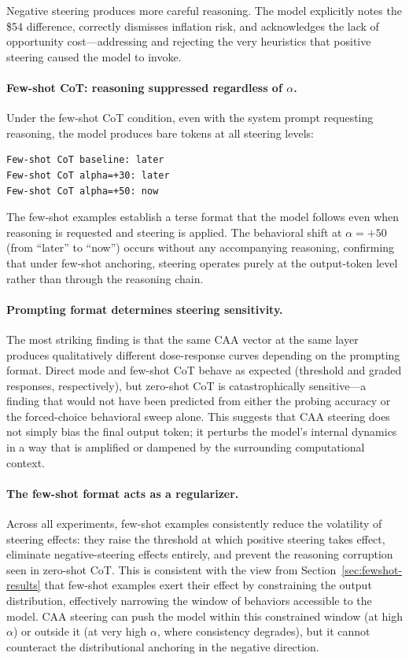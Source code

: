 \noindent Negative steering produces more careful reasoning. The model explicitly notes the \$54 difference, correctly dismisses inflation risk, and acknowledges the lack of opportunity cost---addressing and rejecting the very heuristics that positive steering caused the model to invoke.

\paragraph{Few-shot CoT: reasoning suppressed regardless of $\alpha$.} Under the few-shot CoT condition, even with the system prompt requesting reasoning, the model produces bare tokens at all steering levels:

\begin{lstlisting}[style=cot]
Few-shot CoT baseline: later
Few-shot CoT alpha=+30: later
Few-shot CoT alpha=+50: now
\end{lstlisting}

\noindent The few-shot examples establish a terse format that the model follows even when reasoning is requested and steering is applied. The behavioral shift at $\alpha = +50$ (from ``later'' to ``now'') occurs without any accompanying reasoning, confirming that under few-shot anchoring, steering operates purely at the output-token level rather than through the reasoning chain.

\paragraph{Prompting format determines steering sensitivity.} The most striking finding is that the same CAA vector at the same layer produces qualitatively different dose-response curves depending on the prompting format. Direct mode and few-shot CoT behave as expected (threshold and graded responses, respectively), but zero-shot CoT is catastrophically sensitive---a finding that would not have been predicted from either the probing accuracy or the forced-choice behavioral sweep alone. This suggests that CAA steering does not simply bias the final output token; it perturbs the model's internal dynamics in a way that is amplified or dampened by the surrounding computational context.

\paragraph{The few-shot format acts as a regularizer.} Across all experiments, few-shot examples consistently reduce the volatility of steering effects: they raise the threshold at which positive steering takes effect, eliminate negative-steering effects entirely, and prevent the reasoning corruption seen in zero-shot CoT. This is consistent with the view from Section~\ref{sec:fewshot-results} that few-shot examples exert their effect by constraining the output distribution, effectively narrowing the window of behaviors accessible to the model. CAA steering can push the model within this constrained window (at high $\alpha$) or outside it (at very high $\alpha$, where consistency degrades), but it cannot counteract the distributional anchoring in the negative direction.
